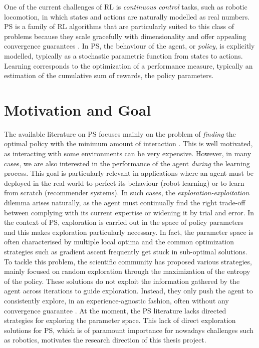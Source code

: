 One of the current challenges of \gls{RL} is \emph{continuous control}  tasks, such as robotic locomotion, in which states and actions are naturally modelled as real numbers. \gls{PS} is a family of \gls{RL} algorithms that are particularly suited to this class of problems because they scale gracefully with dimensionality and offer appealing convergence guarantees \cite{deisenroth2013survey}. In \gls{PS}, the behaviour of the agent, or \textit{policy}, is explicitly modelled, typically as a stochastic parametric function from states to actions. Learning corresponds to the optimization of a performance measure, typically an estimation of the cumulative sum of rewards, \wrt the policy parameters. 

\section{Motivation and Goal}

The available literature on \gls{PS} focuses mainly on the problem of \textit{finding} the optimal policy with the minimum amount of interaction \cite{sutton2000policy, sehnke2008policy, silver2014deterministic, schulman2015trust, mnih2016asynchronous, espeholt2018impala}. This is well motivated, as interacting with some environments can be very expensive. However, in many cases, we are also interested in the performance of the agent \textit{during} the learning process. This goal is particularly relevant in applications where an agent must be deployed in the real world to perfect its behaviour (\eg robot learning) or to learn from scratch (\eg recommender systems). In such cases, the \textit{exploration-exploitation} dilemma arises naturally, as the agent must continually find the right trade-off between complying with its current expertise or widening it by trial and error. In the context of \gls{PS}, exploration is carried out in the space of policy parameters and this makes exploration particularly necessary. In fact, the parameter space is often characterised by multiple local optima and the common optimization strategies such as gradient ascent frequently get stuck in sub-optimal solutions. To tackle this problem, the scientific community has proposed various strategies, mainly focused on random exploration through the maximization of the entropy of the policy. These solutions do not exploit the information gathered by the agent across iterations to guide exploration. Instead, they only push the agent to consistently explore, in an experience-agnostic fashion, often without any convergence guarantee \cite{ziebart2008maximum, haarnoja2017reinforcement, haarnoja2018soft}. At the moment, the \gls{PS} literature lacks directed strategies for exploring the parameter space. This lack of direct exploration solutions for \gls{PS}, which is of paramount importance for nowadays challenges such as robotics, motivates the research direction of this thesis project. 

